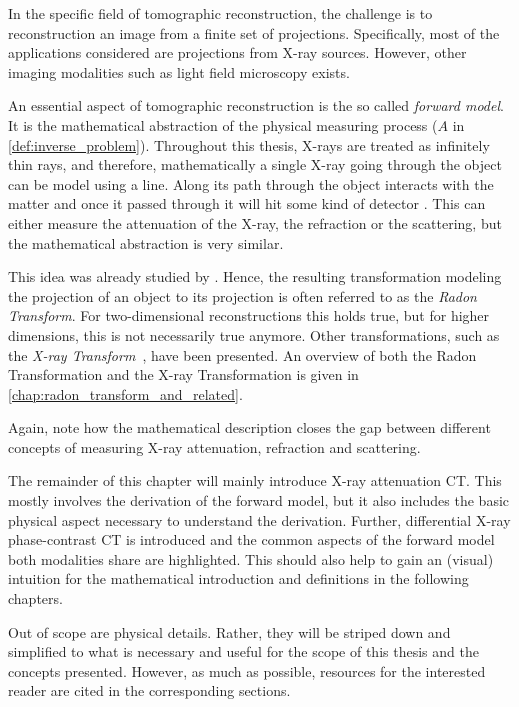 In the specific field of tomographic reconstruction, the challenge is to reconstruction an image
from a finite set of projections. Specifically, most of the applications considered are projections
from X-ray sources. However, other imaging modalities such as light field microscopy exists.

An essential aspect of tomographic reconstruction is the so called \textit{forward model}. It is
the mathematical abstraction of the physical measuring process (\(A\) in
\autoref{def:inverse_problem}). Throughout this thesis, X-rays are treated as infinitely thin rays,
and therefore, mathematically a single X-ray going through the object can be model using a line.
Along its path through the object interacts with the matter and once it passed through it will hit
some kind of detector . This can either measure the
attenuation of the X-ray, the refraction or the scattering, but the mathematical abstraction is very
similar.

This idea was already studied by \citeauthor{radon_uber_1917}. Hence, the resulting transformation
modeling the projection of an object to its projection is often referred to as the \textit{Radon
	Transform}. For two-dimensional reconstructions this holds true, but for higher dimensions,
this is not necessarily true anymore. Other transformations, such as the \textit{X-ray
	Transform}~\cite{solmon_x-ray_1976}, have been presented. An overview of both the Radon
Transformation and the X-ray Transformation is given in \autoref{chap:radon_transform_and_related}.

Again, note how the mathematical description closes the gap between different concepts of
measuring X-ray attenuation, refraction and scattering.

The remainder of this chapter will mainly introduce X-ray attenuation CT. This mostly involves the
derivation of the forward model, but it also includes the basic physical aspect necessary to
understand the derivation. Further, differential X-ray phase-contrast CT is introduced and the
common aspects of the forward model both modalities share are highlighted. This should also help to
gain an (visual) intuition for the mathematical introduction and definitions in the following
chapters.

Out of scope are physical details. Rather, they will be striped down and simplified to what is
necessary and useful for the scope of this thesis and the concepts presented. However, as much as
possible, resources for the interested reader are cited in the corresponding sections.

